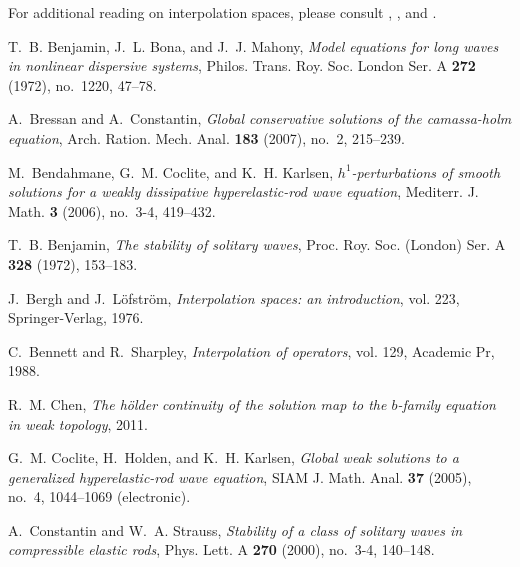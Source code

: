 \documentclass[12pt,reqno]{amsart}
\numberwithin{equation}{section}  %
\numberwithin{figure}{section}
\begin{document}
%
%
For additional reading on interpolation spaces, please consult
\cite{Taylor:1995kx}, \cite{bergh1976interpolation}, and \cite{Bennett:1988ys}.
%
%
\providecommand{\bysame}{\leavevmode\hbox to3em{\hrulefill}\thinspace}
\providecommand{\MR}{\relax\ifhmode\unskip\space\fi MR }
\providecommand{\MRhref}[2]{%
  \href{http://www.ams.org/mathscinet-getitem?mr=#1}{#2}
}
\providecommand{\href}[2]{#2}
\begin{thebibliography}{HKM09}

T.~B. Benjamin, J.~L. Bona, and J.~J. Mahony, \emph{Model equations for long
  waves in nonlinear dispersive systems}, Philos. Trans. Roy. Soc. London Ser.
  A \textbf{272} (1972), no.~1220, 47--78.

A.~Bressan and A.~Constantin, \emph{Global conservative solutions of the
  camassa-holm equation}, Arch. Ration. Mech. Anal. \textbf{183} (2007), no.~2,
  215--239.

M.~Bendahmane, G.~M. Coclite, and K.~H. Karlsen, \emph{$h^1$-perturbations of
  smooth solutions for a weakly dissipative hyperelastic-rod wave equation},
  Mediterr. J. Math. \textbf{3} (2006), no.~3-4, 419--432.

T.~B. Benjamin, \emph{The stability of solitary waves}, Proc. Roy. Soc.
  (London) Ser. A \textbf{328} (1972), 153--183.

J.~Bergh and J.~L{\"o}fstr{\"o}m, \emph{Interpolation spaces: an introduction},
  vol. 223, Springer-Verlag, 1976.

C.~Bennett and R.~Sharpley, \emph{Interpolation of operators}, vol. 129,
  Academic Pr, 1988.

R.~M. Chen, \emph{The h{\"o}lder continuity of the solution map to the
  $b$-family equation in weak topology}, 2011.

G.~M. Coclite, H.~Holden, and K.~H. Karlsen, \emph{Global weak solutions to a
  generalized hyperelastic-rod wave equation}, SIAM J. Math. Anal. \textbf{37}
  (2005), no.~4, 1044--1069 (electronic).

A.~Constantin and W.~A. Strauss, \emph{Stability of a class of solitary waves
  in compressible elastic rods}, Phys. Lett. A \textbf{270} (2000), no.~3-4,
  140--148.


\end{thebibliography}
\end{document}
